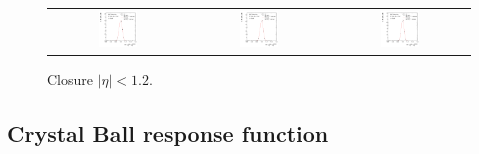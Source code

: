 \begin{figure}[ht]
\begin{tabular}{ccc}
    \includegraphics[width=0.3\textwidth]{figures/ResFit_Spring10QCDFlat_Gauss_Eta0_MCClosure_PtBin10} &
    \includegraphics[width=0.3\textwidth]{figures/ResFit_Spring10QCDFlat_Gauss_Eta0_MCClosure_PtBin11} &
    \includegraphics[width=0.3\textwidth]{figures/ResFit_Spring10QCDFlat_Gauss_Eta0_MCClosure_PtBin12} \\
  \end{tabular}
\caption{Closure \mbox{$|\eta|<1.2$}.}
\label{fig:ResFit:App:Gauss:MCClosure}
\end{figure}

\clearpage


\subsection{Crystal Ball response function}\label{sec:ResFit:App:AllResults:CrystalBall}

